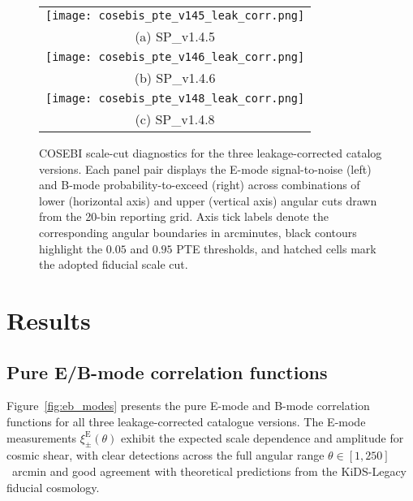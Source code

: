 \documentclass{aa}
\begin{document}
\begin{figure*}[hp]
\centering
\begin{tabular}{c}
\texttt{[image: cosebis\_pte\_v145\_leak\_corr.png]} \\
(a) SP\_v1.4.5 \\[6pt]
\texttt{[image: cosebis\_pte\_v146\_leak\_corr.png]} \\
(b) SP\_v1.4.6 \\[6pt]
\texttt{[image: cosebis\_pte\_v148\_leak\_corr.png]} \\
(c) SP\_v1.4.8
\end{tabular}
\caption{COSEBI scale-cut diagnostics for the three leakage-corrected catalog versions. Each panel pair displays the E-mode signal-to-noise (left) and B-mode probability-to-exceed (right) across combinations of lower (horizontal axis) and upper (vertical axis) angular cuts drawn from the 20-bin reporting grid. Axis tick labels denote the corresponding angular boundaries in arcminutes, black contours highlight the $0.05$ and $0.95$ PTE thresholds, and hatched cells mark the adopted fiducial scale cut.}
\label{fig:cosebis_pte}
\end{figure*}




\section{Results}

\subsection{Pure E/B-mode correlation functions}

Figure~\ref{fig:eb_modes} presents the pure E-mode and B-mode correlation functions for all three leakage-corrected catalogue versions. The E-mode measurements $\xi_\pm^{\mathrm{E}}(\theta)$ exhibit the expected scale dependence and amplitude for cosmic shear, with clear detections across the full angular range $\theta \in [1, 250]$~arcmin and good agreement with theoretical predictions from the KiDS-Legacy fiducial cosmology.
\end{document}
